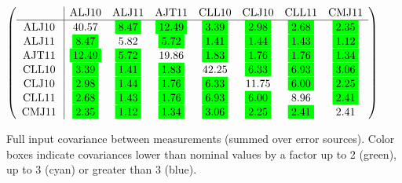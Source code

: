 \begin{table}[H]
\scriptsize
\begin{center}
\renewcommand{\arraystretch}{1.1}
\begin{math}\left(\begin{array}{c|ccccccc}
 & \mathrm{ALJ10} & 
\mathrm{ALJ11} & 
\mathrm{AJT11} & 
\mathrm{CLL10} & 
\mathrm{CLJ10} & 
\mathrm{CLL11} & 
\mathrm{CMJ11} \\
\hline
\mathrm{ALJ10} \hspace*{2pt} &      40.57 &  \colorbox{Green1}{$      8.47$} &  \colorbox{Green1}{$     12.49$} &  \colorbox{Green1}{$      3.39$} &  \colorbox{Green1}{$      2.98$} &  \colorbox{Green1}{$      2.68$} &  \colorbox{Green1}{$      2.35$} \\
\mathrm{ALJ11} \hspace*{2pt} &  \colorbox{Green1}{$      8.47$} &       5.82 &  \colorbox{Green1}{$      5.72$} &  \colorbox{Green1}{$      1.41$} &  \colorbox{Green1}{$      1.44$} &  \colorbox{Green1}{$      1.43$} &  \colorbox{Green1}{$      1.12$} \\
\mathrm{AJT11} \hspace*{2pt} &  \colorbox{Green1}{$     12.49$} &  \colorbox{Green1}{$      5.72$} &      19.86 &  \colorbox{Green1}{$      1.83$} &  \colorbox{Green1}{$      1.76$} &  \colorbox{Green1}{$      1.76$} &  \colorbox{Green1}{$      1.34$} \\
\mathrm{CLL10} \hspace*{2pt} &  \colorbox{Green1}{$      3.39$} &  \colorbox{Green1}{$      1.41$} &  \colorbox{Green1}{$      1.83$} &      42.25 &  \colorbox{Green1}{$      6.33$} &  \colorbox{Green1}{$      6.93$} &  \colorbox{Green1}{$      3.06$} \\
\mathrm{CLJ10} \hspace*{2pt} &  \colorbox{Green1}{$      2.98$} &  \colorbox{Green1}{$      1.44$} &  \colorbox{Green1}{$      1.76$} &  \colorbox{Green1}{$      6.33$} &      11.75 &  \colorbox{Green1}{$      6.00$} &  \colorbox{Green1}{$      2.25$} \\
\mathrm{CLL11} \hspace*{2pt} &  \colorbox{Green1}{$      2.68$} &  \colorbox{Green1}{$      1.43$} &  \colorbox{Green1}{$      1.76$} &  \colorbox{Green1}{$      6.93$} &  \colorbox{Green1}{$      6.00$} &       8.96 &  \colorbox{Green1}{$      2.41$} \\
\mathrm{CMJ11} \hspace*{2pt} &  \colorbox{Green1}{$      2.35$} &  \colorbox{Green1}{$      1.12$} &  \colorbox{Green1}{$      1.34$} &  \colorbox{Green1}{$      3.06$} &  \colorbox{Green1}{$      2.25$} &  \colorbox{Green1}{$      2.41$} &       2.41 \\
\end{array}\right)\end{math}
\caption{Full input covariance between measurements (summed over error sources). Color boxes indicate covariances lower than nominal values by a factor up to 2 (green), up to 3 (cyan) or greater than 3 (blue).}
\renewcommand{\arraystretch}{1}
\end{center}
\end{table}

